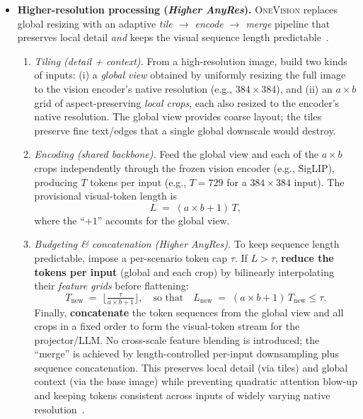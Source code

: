 \begin{enrichment}
\begin{enrichment}
\begin{itemize}
            \item \textbf{Higher-resolution processing (\emph{Higher AnyRes}).}
            \textsc{OneVision} replaces global resizing with an adaptive \emph{tile $\rightarrow$ encode $\rightarrow$ merge} pipeline that preserves local detail \emph{and} keeps the visual sequence length predictable~\cite{li2024_llavaonevision}.
            \begin{enumerate}
                \item \emph{Tiling (detail + context).} From a high-resolution image, build two kinds of inputs: (i) a \emph{global view} obtained by uniformly resizing the full image to the vision encoder’s native resolution (e.g., $384{\times}384$), and (ii) an $a{\times}b$ grid of aspect-preserving \emph{local crops}, each also resized to the encoder’s native resolution. The global view provides coarse layout; the tiles preserve fine text/edges that a single global downscale would destroy.
                \item \emph{Encoding (shared backbone).} Feed the global view and each of the $a{\times}b$ crops independently through the frozen vision encoder (e.g., SigLIP), producing $T$ tokens per input (e.g., $T{=}729$ for a $384{\times}384$ input). The provisional visual-token length is
                \[
                L \;=\; (a\times b + 1)\,T,
                \]
                where the “$+1$” accounts for the global view.
                \item \emph{Budgeting \& concatenation (Higher AnyRes).} To keep sequence length predictable, impose a per-scenario token cap $\tau$. If $L\!>\!\tau$, \textbf{reduce the tokens per input} (global and each crop) by bilinearly interpolating their \emph{feature grids} before flattening:
                \[
                T_{\text{new}} \;=\; \Big\lfloor \tfrac{\tau}{a\times b + 1} \Big\rfloor,
                \quad\text{so that}\quad
                L_{\text{new}} \;=\; (a\times b + 1)\,T_{\text{new}} \le \tau.
                \]
                Finally, \textbf{concatenate} the token sequences from the global view and all crops in a fixed order to form the visual-token stream for the projector/LLM. No cross-scale feature blending is introduced; the “merge” is achieved by length-controlled per-input downsampling plus sequence concatenation. This preserves local detail (via tiles) and global context (via the base image) while preventing quadratic attention blow-up and keeping tokens consistent across inputs of widely varying native resolution~\cite{li2024_llavaonevision}.
            \end{enumerate}
            

\end{itemize}
\end{enrichment}
\end{enrichment}

